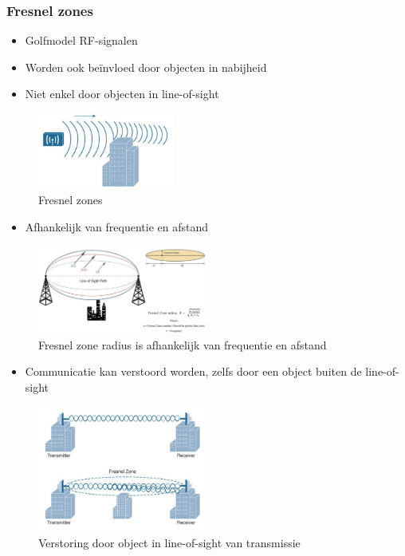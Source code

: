 \documentclass{article}
\begin{document}
\subsubsection{Fresnel zones}
\begin{itemize}
    \item Golfmodel RF-signalen 
    \item Worden ook beïnvloed door objecten in nabijheid
    \item Niet enkel door objecten in line-of-sight
\end{itemize}

\begin{figure}[H]
    \centering
    \includegraphics[width=0.4\textwidth]{Screenshot_20200309_124752.png}
    \caption{Fresnel zones}
\end{figure}

\begin{itemize}
    \item Afhankelijk van frequentie en afstand
\end{itemize}

\begin{figure}[H]
    \centering
    \includegraphics[width=0.5\textwidth]{Screenshot_20200309_124825.png}
    \caption{Fresnel zone radius is afhankelijk van frequentie en afstand}
\end{figure}

\begin{itemize}
    \item Communicatie kan verstoord worden, zelfs door een object buiten de line-of-sight
\end{itemize}

\begin{figure}[H]
    \centering
    \includegraphics[width=0.5\textwidth]{Screenshot_20200309_125331.png}
    \caption{Verstoring door object in line-of-sight van transmissie}
\end{figure}
\end{document}
